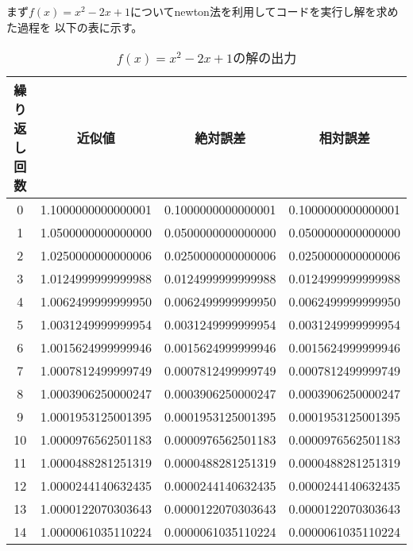 \documentclass[uplatex,dvipdfmx,a4paper,10pt]{jsarticle}
\begin{document}
            \hspace{1em}まず$f(x) = x^2 - 2x + 1$についてnewton法を利用してコードを実行し解を求めた過程を
            以下の表に示す。

            \begin{table}[H]
                \begin{center}
                    \caption{$f(x) = x^2 - 2x + 1$の解の出力}
                    \begin{tabular}{cccc} \hline
                        繰り返し回数 & 近似値 & 絶対誤差 & 相対誤差 \\ \hline
                        0 & 1.1000000000000001 & 0.1000000000000001 & 0.1000000000000001 \\
                        1 & 1.0500000000000000 & 0.0500000000000000 & 0.0500000000000000 \\
                        2 & 1.0250000000000006 & 0.0250000000000006 & 0.0250000000000006 \\
                        3 & 1.0124999999999988 & 0.0124999999999988 & 0.0124999999999988 \\
                        4 & 1.0062499999999950 & 0.0062499999999950 & 0.0062499999999950 \\
                        5 & 1.0031249999999954 & 0.0031249999999954 & 0.0031249999999954 \\
                        6 & 1.0015624999999946 & 0.0015624999999946 & 0.0015624999999946 \\
                        7 & 1.0007812499999749 & 0.0007812499999749 & 0.0007812499999749 \\
                        8 & 1.0003906250000247 & 0.0003906250000247 & 0.0003906250000247 \\
                        9 & 1.0001953125001395 & 0.0001953125001395 & 0.0001953125001395 \\
                        10 & 1.0000976562501183 & 0.0000976562501183 & 0.0000976562501183 \\
                        11 & 1.0000488281251319 & 0.0000488281251319 & 0.0000488281251319 \\
                        12 & 1.0000244140632435 & 0.0000244140632435 & 0.0000244140632435 \\
                        13 & 1.0000122070303643 & 0.0000122070303643 & 0.0000122070303643 \\
                        14 & 1.0000061035110224 & 0.0000061035110224 & 0.0000061035110224 \\

\end{tabular}
\end{center}
\end{table}
\end{document}
